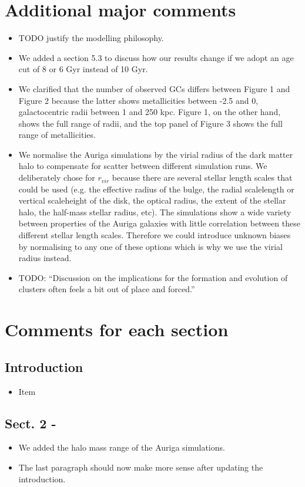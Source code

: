 \documentclass{article}
\begin{document}
\section*{Additional major comments}
\begin{itemize}
\item TODO justify the modelling philosophy.
\item We added a section 5.3 to discuss how our results change if we adopt an
age cut of 8 or 6 Gyr instead of 10 Gyr.
\item We clarified that the number of observed GCs differs between Figure 1 and 
Figure 2 because the latter shows metallicities between -2.5 and 0, galactocentric 
radii between 1 and 250 kpc. Figure 1, on the other hand, shows the full range
of radii, and the top panel of Figure 3 shows the full range of metallicities.
\item We normalise the Auriga simulations by the virial radius of the
dark matter halo to compensate for scatter between different simulation runs. We
deliberately chose for $r_{vir}$ because there are several stellar length scales
that could be used (e.g. the effective radius of the bulge, the radial scalelength
or vertical scaleheight of the disk, the optical radius, the extent of the stellar 
halo, the half-mass stellar radius, etc). The simulations show a wide variety 
between properties of the Auriga galaxies with little correlation between these 
different stellar length scales. Therefore we could introduce unknown biases by 
normalising to any one of these options which is why we use the virial radius instead.
\item TODO: ``Discussion on the implications for the formation and evolution of clusters
    often feels a bit out of place and forced.''

\end{itemize}


\section*{Comments for each section}
\subsection*{Introduction}
\begin{itemize}
\item Item
\end{itemize}

\subsection*{Sect. 2 -}
\begin{itemize}
\item We added the halo mass range of the Auriga simulations.
\item The last paragraph should now make more sense after updating the introduction.
\end{itemize}
\end{document}
